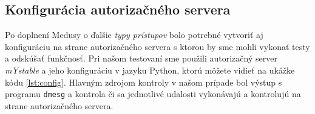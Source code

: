 \subsection{Konfigurácia autorizačného servera}
Po doplnení Medusy o ďalšie \textit{typy prístupov} bolo potrebné vytvoriť aj konfiguráciu na strane autorizačného servera s ktorou by sme mohli vykonať testy a odskúšať funkčnosť. Pri našom testovaní sme použili autorizačný server \textit{mYstable} a jeho konfiguráciu v jazyku Python, ktorú môžete vidieť na ukážke kódu \ref{lst:config}. Hlavným zdrojom kontroly v našom prípade bol výstup s programu \texttt{dmesg} a kontrola či sa jednotlivé udalosti vykonávajú a kontrolujú na strane autorizačného servera.